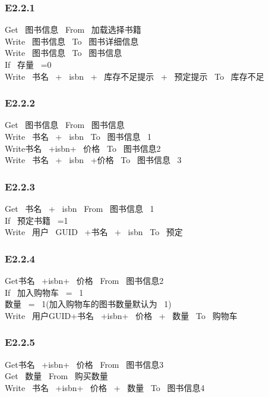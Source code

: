 \documentclass{article}
\begin{document}
\begin{CJK*}{UTF8}{gbsn}
\subsubsection*{E2.2.1}
Get \ 图书信息 \ From \ 加载选择书籍 \\ 
Write \ 图书信息 \ To \ 图书详细信息 \\ 
Write \ 图书信息 \ To \ 图书信息\\ 
If \ 存量 \ =0\\ 
Write \ 书名 \ + \ isbn \ + \ 库存不足提示 \ + \ 预定提示 \ To \ 库存不足\\ 
\vspace{-1mm}
\subsubsection*{E2.2.2}
Get \ 图书信息 \ From \ 图书信息\\ 
Write \ 书名 \ + \ isbn \ To \ 图书信息 \ 1 \\ 
Write书名 \ +isbn+ \ 价格 \ To \ 图书信息2 \\ 
Write \ 书名 \ + \ isbn \ +价格 \ To \ 图书信息 \ 3\\ 
\vspace{-1mm}
\subsubsection*{E2.2.3}
Get \ 书名 \ + \ isbn \ From \ 图书信息 \ 1 \\ 
If \ 预定书籍 \ =1\\ 
Write \ 用户 \ GUID \ +书名 \ + \ isbn \ To \ 预定\\ 
\vspace{-1mm}
\subsubsection*{E2.2.4}
Get书名 \ +isbn+ \ 价格 \ From \ 图书信息2 \\ 
If \ 加入购物车 \ = \ 1\\ 
数量 \ = \ 1(加入购物车的图书数量默认为 \ 1)\\ 
Write \ 用户GUID+书名 \ +isbn+ \ 价格 \ + \ 数量 \ To \ 购物车\\ 
\vspace{-1mm}
\subsubsection*{E2.2.5}
Get书名 \ +isbn+ \ 价格 \ From \ 图书信息3\\ 
Get \ 数量 \ From \ 购买数量\\ 
Write \ 书名 \ +isbn+ \ 价格 \ + \ 数量 \ To \ 图书信息4\\ 
\vspace{-1mm}

\end{CJK*}
\end{document}
